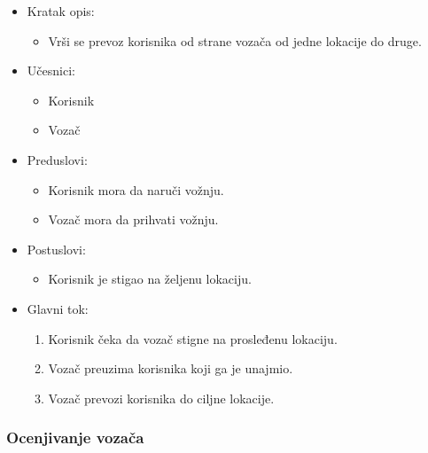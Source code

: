 \begin{itemize}
	\item Kratak opis:
		\begin{itemize}
			\item Vrši se prevoz korisnika od strane vozača od jedne lokacije do druge.
		\end{itemize}
	\item Učesnici:
		\begin{itemize}
		    \item Korisnik
		    \item Vozač
		\end{itemize}				
	\item Preduslovi:
		\begin{itemize}
		    \item Korisnik mora da naruči vožnju.
		    \item Vozač mora da prihvati vožnju.
		\end{itemize}
	\item Postuslovi:
		\begin{itemize}
			\item Korisnik je stigao na željenu lokaciju.
		\end{itemize}	
	\item Glavni tok:
		\begin{enumerate}
		    \item Korisnik čeka da vozač stigne na prosleđenu lokaciju.
		    \item Vozač preuzima korisnika koji ga je unajmio.  
		    \item Vozač prevozi korisnika do ciljne lokacije.
		\end{enumerate}
\end{itemize}


\subsubsection{\bfseries Ocenjivanje vozača}

